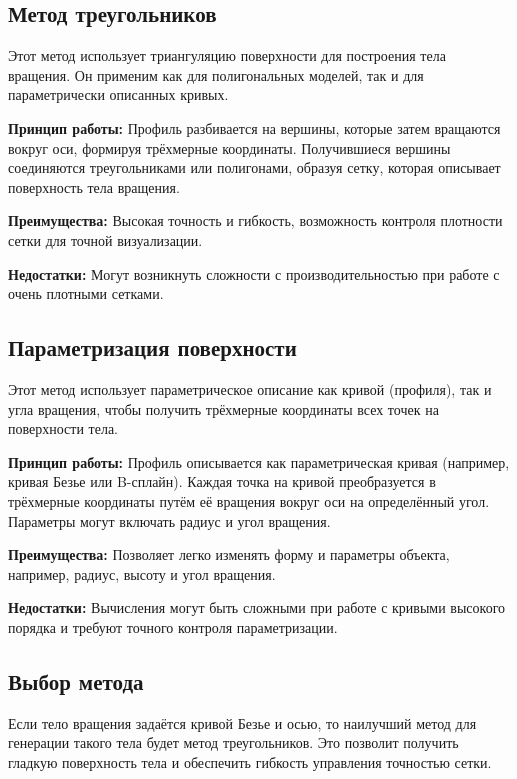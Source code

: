 \subsection{Метод треугольников}

Этот метод использует триангуляцию поверхности для построения тела вращения. Он применим как для полигональных моделей, так и для параметрически описанных кривых.

\textbf{Принцип работы:} Профиль разбивается на вершины, которые затем вращаются вокруг оси, формируя трёхмерные координаты. Получившиеся вершины соединяются треугольниками или полигонами, образуя сетку, которая описывает поверхность тела вращения.

\textbf{Преимущества:} Высокая точность и гибкость, возможность контроля плотности сетки для точной визуализации.

\textbf{Недостатки:} Могут возникнуть сложности с производительностью при работе с очень плотными сетками.

\subsection{Параметризация поверхности}

Этот метод использует параметрическое описание как кривой (профиля), так и угла вращения, чтобы получить трёхмерные координаты всех точек на поверхности тела.

\textbf{Принцип работы:} Профиль описывается как параметрическая кривая (например, кривая Безье или B-сплайн). Каждая точка на кривой преобразуется в трёхмерные координаты путём её вращения вокруг оси на определённый угол. Параметры могут включать радиус и угол вращения.

\textbf{Преимущества:} Позволяет легко изменять форму и параметры объекта, например, радиус, высоту и угол вращения.

\textbf{Недостатки:} Вычисления могут быть сложными при работе с кривыми высокого порядка и требуют точного контроля параметризации.

\subsection{Выбор метода}

Если тело вращения задаётся кривой Безье и осью, то наилучший метод для генерации такого тела будет метод треугольников. Это позволит получить гладкую поверхность тела и обеспечить гибкость управления точностью сетки.

